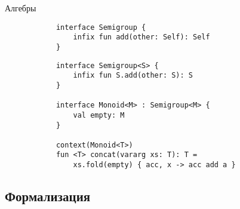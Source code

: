 \documentclass[handout,aspectratio=169,usenames,dvipsnames]{beamer}
\begin{document}
    \begin{frame}[fragile]{Алгебры}
        \begin{verbatim}
            interface Semigroup {
                infix fun add(other: Self): Self
            }
        \end{verbatim}

        \vspace{1em}
        \begin{verbatim}
            interface Semigroup<S> {
                infix fun S.add(other: S): S
            }

            interface Monoid<M> : Semigroup<M> {
                val empty: M
            }

            context(Monoid<T>)
            fun <T> concat(vararg xs: T): T =
                xs.fold(empty) { acc, x -> acc add a }
        \end{verbatim}
    \end{frame}


    \subsection{Формализация}
\end{document}
